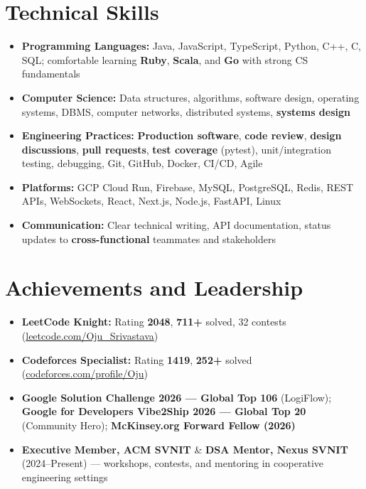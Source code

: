 \documentclass[a4paper,10pt]{article}
\begin{document}
\section{Technical Skills}
\small
\begin{itemize}[label={}]
  \item \textbf{Programming Languages:} Java, JavaScript, TypeScript, Python, C++, C, SQL; comfortable learning \textbf{Ruby}, \textbf{Scala}, and \textbf{Go} with strong CS fundamentals
  \item \textbf{Computer Science:} Data structures, algorithms, software design, operating systems, DBMS, computer networks, distributed systems, \textbf{systems design}
  \item \textbf{Engineering Practices:} \textbf{Production software}, \textbf{code review}, \textbf{design discussions}, \textbf{pull requests}, \textbf{test coverage} (pytest), unit/integration testing, debugging, Git, GitHub, Docker, CI/CD, Agile
  \item \textbf{Platforms:} GCP Cloud Run, Firebase, MySQL, PostgreSQL, Redis, REST APIs, WebSockets, React, Next.js, Node.js, FastAPI, Linux
  \item \textbf{Communication:} Clear technical writing, API documentation, status updates to \textbf{cross-functional} teammates and stakeholders
\end{itemize}

\section{Achievements and Leadership}
\small
\begin{itemize}
  \item \textbf{LeetCode Knight:} Rating \textbf{2048}, \textbf{711+} solved, 32 contests (\href{https://leetcode.com/Oju_Srivastava}{leetcode.com/Oju\_Srivastava})
  \item \textbf{Codeforces Specialist:} Rating \textbf{1419}, \textbf{252+} solved (\href{https://codeforces.com/profile/Oju}{codeforces.com/profile/Oju})
  \item \textbf{Google Solution Challenge 2026 --- Global Top 106} (LogiFlow); \textbf{Google for Developers Vibe2Ship 2026 --- Global Top 20} (Community Hero); \textbf{McKinsey.org Forward Fellow (2026)}
  \item \textbf{Executive Member, ACM SVNIT} \& \textbf{DSA Mentor, Nexus SVNIT} (2024--Present) --- workshops, contests, and mentoring in cooperative engineering settings
\end{itemize}
\end{document}
